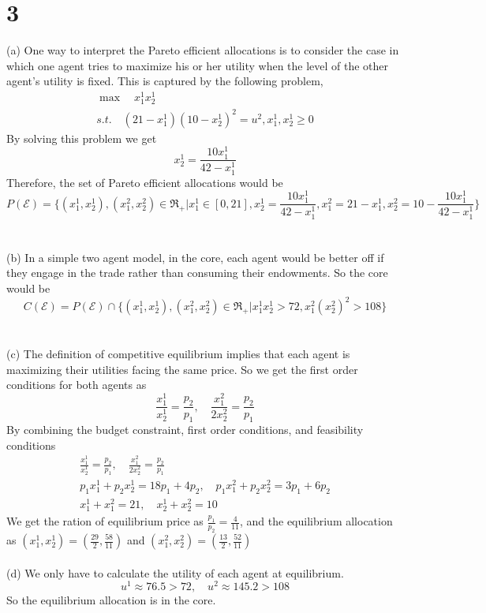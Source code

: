 \documentclass[12pt]{article}
\begin{document}
\section*{3}
(a) One way to interpret the Pareto efficient allocations is to consider the case in which one agent tries to maximize his or her utility when the level of the other agent's utility is fixed. This is captured by the following problem,
\begin{gather*}
\max \quad x_1^1x_2^1\\
s.t. \quad (21-x_1^1)(10-x^1_2)^2=u^2, x^1_1, x^1_2\geq 0
\end{gather*}
By solving this problem we get
\begin{equation*}
x^1_2=\frac{10x^1_1}{42-x^1_1}
\end{equation*}
Therefore, the set of Pareto efficient allocations would be
\begin{equation*}
P(\mathcal{E})=\{(x^1_1,x^1_2),(x^2_1,x^2_2)\in\Re_+|x^1_1\in[0,21], x^1_2=\frac{10x^1_1}{42-x^1_1}, x^2_1=21-x^1_1, x^2_2=10-\frac{10x^1_1}{42-x^1_1}\}
\end{equation*}\\
\\
(b) In a simple two agent model, in the core, each agent would be better off if they engage in the trade rather than consuming their endowments. So the core would be
\begin{equation*}
C(\mathcal{E})=P(\mathcal{E})\cap\{(x^1_1,x^1_2),(x^2_1,x^2_2)\in\Re_+|x^1_1x^1_2>72, x^2_1(x^2_2)^2>108\}
\end{equation*}\\
\\
(c) The definition of competitive equilibrium implies that each agent is maximizing their utilities facing the same price. So we get the first order conditions for both agents as
\begin{equation*}
\frac{x^1_1}{x^1_2}=\frac{p_2}{p_1},\quad \frac{x^2_1}{2x^2_2}=\frac{p_2}{p_1}
\end{equation*}
By combining the budget constraint, first order conditions, and feasibility conditions
\begin{gather*}
\frac{x^1_1}{x^1_2}=\frac{p_2}{p_1},\quad \frac{x^2_1}{2x^2_2}=\frac{p_2}{p_1}\\
p_1x^1_1+p_2x^1_2=18p_1+4p_2,\quad p_1x^2_1+p_2x^2_2=3p_1+6p_2\\
x^1_1+x^2_1=21,\quad x^1_2+x^2_2=10
\end{gather*}
We get the ration of equilibrium price as $\frac{p_1}{p_2}=\frac{4}{11}$, and the equilibrium allocation as $(x^1_1,x^1_2)=(\frac{29}{2},\frac{58}{11})$ and $(x^2_1,x^2_2)=(\frac{13}{2},\frac{52}{11})$\\
\\
(d) We only have to calculate the utility of each agent at equilibrium.
\begin{equation*}
u^1\approx 76.5>72,\quad u^2\approx 145.2>108
\end{equation*}
So the equilibrium allocation is in the core.
\end{document}
